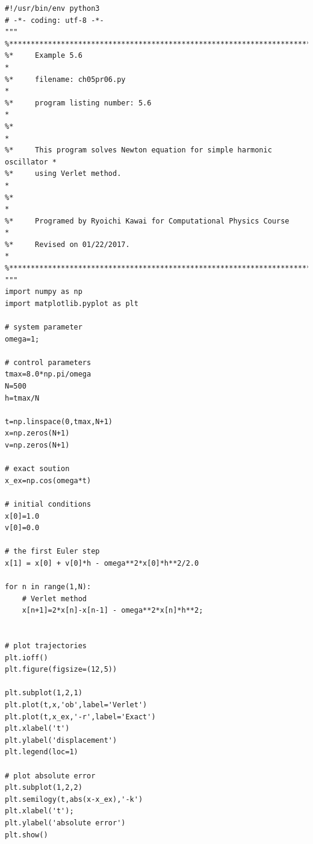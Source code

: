 \normalsize
{}

\bigskip
\noindent
\program
\footnotesize
\begin{verbatim}
#!/usr/bin/env python3
# -*- coding: utf-8 -*-
"""
%**************************************************************************
%*     Example 5.6                                                        *
%*     filename: ch05pr06.py                                              *
%*     program listing number: 5.6                                        *
%*                                                                        *
%*     This program solves Newton equation for simple harmonic oscillator *
%*     using Verlet method.                                               *
%*                                                                        *
%*     Programed by Ryoichi Kawai for Computational Physics Course        *
%*     Revised on 01/22/2017.                                             *
%**************************************************************************
"""
import numpy as np
import matplotlib.pyplot as plt

# system parameter
omega=1;

# control parameters
tmax=8.0*np.pi/omega
N=500
h=tmax/N

t=np.linspace(0,tmax,N+1)
x=np.zeros(N+1)
v=np.zeros(N+1)

# exact soution
x_ex=np.cos(omega*t)

# initial conditions
x[0]=1.0
v[0]=0.0

# the first Euler step
x[1] = x[0] + v[0]*h - omega**2*x[0]*h**2/2.0

for n in range(1,N):
    # Verlet method
    x[n+1]=2*x[n]-x[n-1] - omega**2*x[n]*h**2;


# plot trajectories
plt.ioff()
plt.figure(figsize=(12,5))

plt.subplot(1,2,1)
plt.plot(t,x,'ob',label='Verlet')
plt.plot(t,x_ex,'-r',label='Exact')
plt.xlabel('t')
plt.ylabel('displacement')
plt.legend(loc=1)

# plot absolute error
plt.subplot(1,2,2)
plt.semilogy(t,abs(x-x_ex),'-k')
plt.xlabel('t');
plt.ylabel('absolute error')
plt.show()
\end{verbatim}

\normalsize
{}

